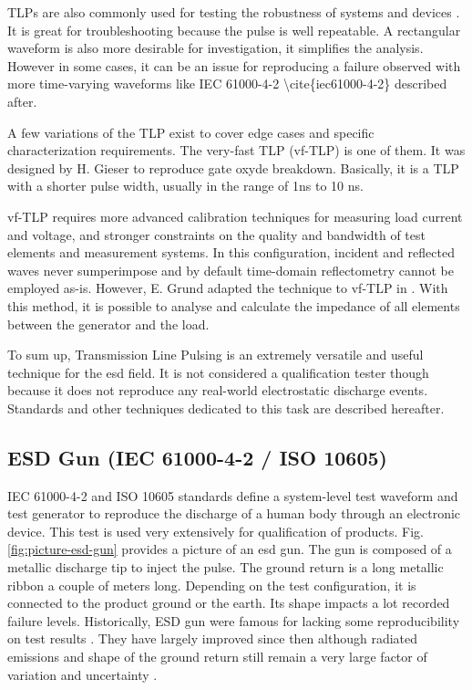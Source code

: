 TLPs are also commonly used for testing the robustness of systems and devices \cite{TLPthroubleshooting, LacrampeTransientImmunity}.
It is great for troubleshooting because the pulse is well repeatable.
A rectangular waveform is also more desirable for investigation, it simplifies the analysis.
However in some cases, it can be an issue for reproducing a failure observed with more time-varying waveforms like IEC 61000-4-2 \gls{\cite{iec61000-4-2}} described after.

A few variations of the TLP exist to cover edge cases and specific characterization requirements.
The very-fast \gls{TLP} (vf-TLP) is one of them.
It was designed by H. Gieser \cite{vf-tlp} to reproduce gate oxyde breakdown.
Basically, it is a TLP with a shorter pulse width, usually in the range of 1ns to 10 ns.

vf-TLP requires more advanced calibration techniques for measuring load current and voltage, and stronger constraints on the quality and bandwidth of test elements and measurement systems.
In this configuration, incident and reflected waves never sumperimpose and by default time-domain reflectometry cannot be employed as-is.
However, E. Grund adapted the technique to vf-TLP in \cite{vf-tlp-tdr}.
With this method, it is possible to analyse and calculate the impedance of all elements between the generator and the load.

To sum up, Transmission Line Pulsing is an extremely versatile and useful technique for the \gls{esd} field.
It is not considered a qualification tester though because it does not reproduce any real-world electrostatic discharge events.
Standards and other techniques dedicated to this task are described hereafter.

\subsection{ESD Gun (IEC 61000-4-2 / ISO 10605)}

IEC 61000-4-2 \cite{iec61000-4-2} and ISO 10605 \cite{iso10605} standards define a system-level test waveform and test generator to reproduce the discharge of a human body through an electronic device.
This test is used very extensively for qualification of products.
Fig. \ref{fig:picture-esd-gun} provides a picture of an \gls{esd} gun.
The gun is composed of a metallic discharge tip to inject the pulse.
The ground return is a long metallic ribbon a couple of meters long.
Depending on the test configuration, it is connected to the product ground or the earth.
Its shape impacts a lot recorded failure levels.
Historically, ESD gun were famous for lacking some reproducibility on test results \cite{hmm-uncertainty}.
They have largely improved since then although radiated emissions and shape of the ground return still remain a very large factor of variation and uncertainty \cite{gun-rf-uncertainty}.

